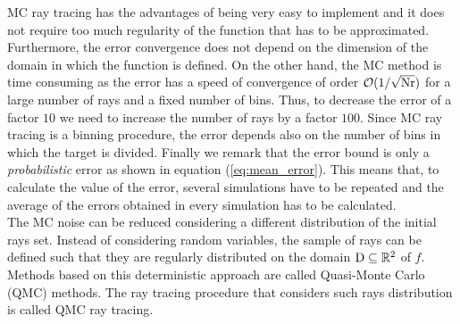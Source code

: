 MC ray tracing has the advantages of being very easy to implement and it does not require too much regularity of the function that has to be approximated. Furthermore, the error convergence does not depend on the dimension of the domain in which the function is defined.
On the other hand, the MC method is time consuming as the error has a speed of convergence of order $\mathcal{O}(1/\sqrt{\textrm{Nr}})$ for a large number of rays and a fixed number of bins. 
Thus, to decrease the error of a factor $10$ we need to increase the number of rays by a factor $100$.
Since MC ray tracing is a binning procedure, the error depends also on the number of bins in which the target is divided. Finally we remark that the error bound is only a \emph{probabilistic} error as shown in equation (\ref{eq:mean_error}). This means that, to calculate the value of the error, several simulations have to be repeated and the average of the errors obtained in every simulation has to be calculated. \\ \indent 
The MC noise can be reduced considering a different distribution of the initial rays set.
Instead of considering random variables, the sample of rays can be defined such that they are regularly distributed on the domain $\mbox{$\textup{D}$}\subseteq\mathbb{R}^2$ of $f$. Methods based on this deterministic approach are called Quasi-Monte Carlo (QMC) methods. The ray tracing procedure that considers such rays distribution is called QMC ray tracing.
